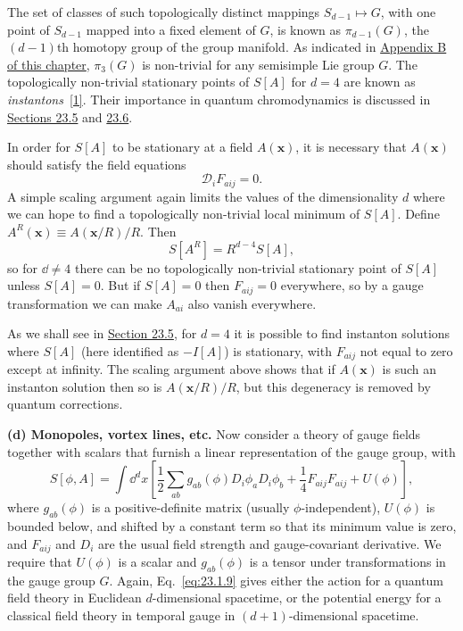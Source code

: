 The set of classes of such topologically distinct mappings
$S_{d-1}\mapsto G$, with one point of $S_{d-1}$ mapped into a fixed element
of $G$, is known as $\pi_{d-1}(G)$, the $(d-1)$th homotopy group of the
group manifold. As indicated in
\hyperref[app:23.B]{Appendix B of this chapter}, $\pi_3(G)$ is non-trivial
for any semisimple Lie group $G$. The topologically non-trivial stationary
points of $S[A]$ for $d=4$ are known as
\emph{instantons}~\hyperref[ch23-ref-1]{[1]}. Their importance in quantum
chromodynamics is discussed in \hyperref[sec:23.5]{Sections 23.5} and
\hyperref[sec:23.6]{23.6}.

In order for $S[A]$ to be stationary at a field $A(\mathbf{x})$, it is
necessary that $A(\mathbf{x})$ should satisfy the field equations
\begin{equation}
 \mathcal D_iF_{a ij}=0.
 \tag{23.1.8}\label{eq:23.1.8}
\end{equation}
A simple scaling argument again limits the values of the dimensionality $d$
where we can hope to find a topologically non-trivial local minimum of
$S[A]$. Define $A^R(\mathbf{x})\equiv A(\mathbf{x}/R)/R$. Then
\[
 S[A^R]=R^{d-4}S[A],
\]
so for $\dd\ne4$ there can be no topologically non-trivial stationary point of
$S[A]$ unless $S[A]=0$. But if $S[A]=0$ then
$F_{a ij}=0$ everywhere, so by a gauge transformation we can make
$A_{a i}$ also vanish everywhere.

As we shall see in \hyperref[sec:23.5]{Section 23.5}, for $d=4$ it is
possible to find instanton solutions where $S[A]$ (here identified as
$-I[A]$) is stationary, with $F_{a ij}$ not equal to zero except at
infinity. The scaling argument above shows that if $A(\mathbf{x})$ is such
an instanton solution then so is $A(\mathbf{x}/R)/R$, but this degeneracy
is removed by quantum corrections.

\noindent\textbf{(d) Monopoles, vortex lines, etc.} Now consider a theory of
gauge fields together with scalars that furnish a linear representation of
the gauge group, with
\begin{equation}
 S[\phi,A]=\int \dd^d x\left[
  \frac{1}{2}\sum_{ab}g_{ab}(\phi)D_i\phi_aD_i\phi_b
  +\frac{1}{4}F_{a ij}F_{a ij}+U(\phi)
 \right],
 \tag{23.1.9}\label{eq:23.1.9}
\end{equation}
where $g_{ab}(\phi)$ is a positive-definite matrix (usually
$\phi$-independent), $U(\phi)$ is bounded below, and shifted by a constant
term so that its minimum value is zero, and $F_{a ij}$ and $D_i$ are
the usual field strength and gauge-covariant derivative. We require that
$U(\phi)$ is a scalar and $g_{ab}(\phi)$ is a tensor under transformations
in the gauge group $G$. Again, Eq.~\eqref{eq:23.1.9} gives either the action
for a quantum field theory in Euclidean $d$-dimensional spacetime, or the
potential energy for a classical field theory in temporal gauge in
$(d+1)$-dimensional spacetime.

